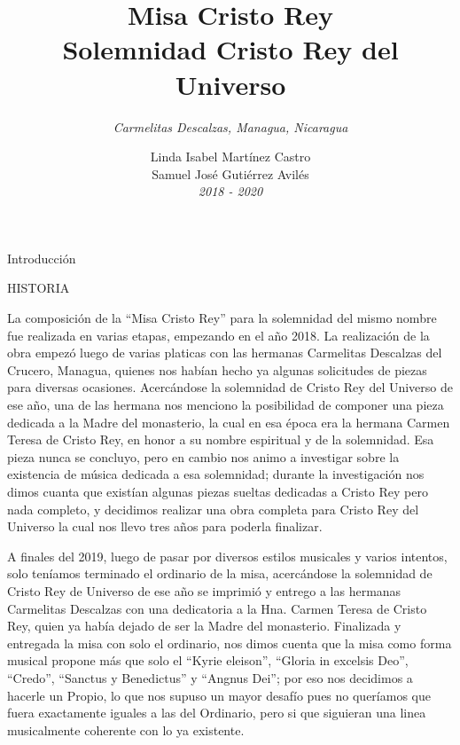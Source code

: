 \documentclass[12pt, letterpaper]{report}
\title{ \textbf{ \Huge Misa Cristo Rey  } \\ { \LARGE Solemnidad Cristo Rey del Universo } }
\author{ \textit{ \large Carmelitas Descalzas, Managua, Nicaragua } }
\date{ \LARGE Linda Isabel Mart\'inez Castro \\ Samuel Jos\'e Guti\'errez Avil\'es \\ \small \textit{2018 - 2020} }
\begin{document}

    \maketitle

    \begin{center}
        \vspace*{9cm}
        { \Huge Introducci\'on \par}
    \end{center}
    \clearpage

    \LARGE HISTORIA

    \Large La composici\'on de la ``Misa Cristo Rey'' para la solemnidad del mismo nombre fue realizada en varias etapas,
    empezando en el a\~no 2018. La realizaci\'on de la obra empez\'o luego de varias platicas con las hermanas Carmelitas
    Descalzas del Crucero, Managua, quienes nos hab\'ian hecho ya algunas solicitudes de piezas para diversas ocasiones.
    Acerc\'andose la solemnidad de Cristo Rey del Universo de ese a\~no, una de las hermana nos menciono la posibilidad
    de componer una pieza dedicada a la Madre del monasterio, la cual en esa \'epoca era la hermana Carmen Teresa de Cristo Rey,
    en honor a su nombre espiritual y de la solemnidad. Esa pieza nunca se concluyo, pero en cambio nos animo a
    investigar sobre la existencia de m\'usica dedicada a esa solemnidad; durante la investigaci\'on nos dimos cuanta
    que exist\'ian algunas piezas sueltas dedicadas a Cristo Rey pero nada completo, y decidimos realizar una obra
    completa para Cristo Rey del Universo la cual nos llevo tres a\~nos para poderla finalizar.

    A finales del 2019, luego de pasar por diversos estilos musicales y varios intentos, solo ten\'iamos terminado el
    ordinario de la misa, acerc\'andose la solemnidad de Cristo Rey de Universo de ese a\~no se imprimi\'o y entrego a las
    hermanas Carmelitas Descalzas con una dedicatoria a la Hna. Carmen Teresa de Cristo Rey, quien ya hab\'ia dejado
    de ser la Madre del monasterio. Finalizada y entregada la misa con solo el ordinario, nos dimos cuenta que la misa
    como forma musical propone m\'as que solo el ``Kyrie eleison'', ``Gloria in excelsis Deo'', ``Credo'', ``Sanctus y Benedictus''
    y ``Angnus Dei''; por eso nos decidimos a hacerle un Propio, lo que nos supuso un mayor desaf\'io pues no quer\'iamos que
    fuera exactamente iguales a las del Ordinario, pero si que siguieran una linea musicalmente coherente con lo ya existente.
\end{document}
